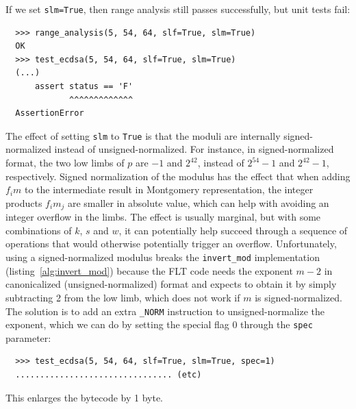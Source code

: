 \documentclass{llncs}
\begin{document}
If we set \verb+slm=True+, then range analysis still passes successfully,
but unit tests fail:
{\small\begin{verbatim}
  >>> range_analysis(5, 54, 64, slf=True, slm=True)
  OK
  >>> test_ecdsa(5, 54, 64, slf=True, slm=True)
  (...)
      assert status == 'F'
             ^^^^^^^^^^^^^
  AssertionError
\end{verbatim}}
The effect of setting \verb+slm+ to \verb+True+ is that the moduli are
internally signed-normalized instead of unsigned-normalized. For
instance, in signed-normalized format, the two low limbs of $p$ are $-1$
and $2^{42}$, instead of $2^{54}-1$ and $2^{42}-1$, respectively. Signed
normalization of the modulus has the effect that when adding $f_i m$ to
the intermediate result in Montgomery representation, the integer
products $f_i m_j$ are smaller in absolute value, which can help with
avoiding an integer overflow in the limbs. The effect is usually
marginal, but with some combinations of $k$, $s$ and $w$, it can
potentially help succeed through a sequence of operations that would
otherwise potentially trigger an overflow. Unfortunately, using a
signed-normalized modulus breaks the \verb+invert_mod+ implementation
(listing~\ref{alg:invert_mod}) because the FLT code needs the exponent
$m-2$ in canonicalized (unsigned-normalized) format and expects to
obtain it by simply subtracting 2 from the low limb, which does not work
if $m$ is signed-normalized. The solution is to add an extra \verb+_NORM+
instruction to unsigned-normalize the exponent, which we can do by setting
the special flag 0 through the \verb+spec+ parameter:
{\small\begin{verbatim}
  >>> test_ecdsa(5, 54, 64, slf=True, slm=True, spec=1)
  ................................ (etc)
\end{verbatim}}
This enlarges the bytecode by 1 byte.
\end{document}
